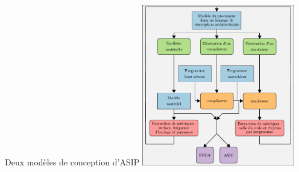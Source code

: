 \begin{frame}[c,noframenumbering]{Deux modèles de conception d'ASIP}
  \centering
  \includegraphics[width=0.5\textwidth]{./fig/methodos-2}
\end{frame}

